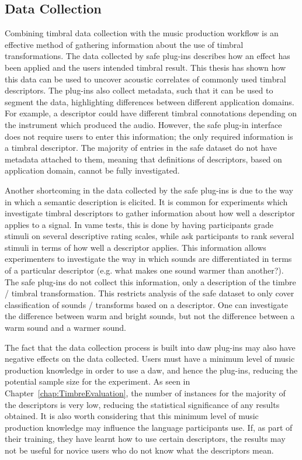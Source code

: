 	\subsection{Data Collection}
	\label{sec:Conclusion-Critique-DataCollection}
		Combining timbral data collection with the music production workflow is an effective method of gathering
		information about the use of timbral transformations. The data collected by \acrshort{safe} plug-ins
		describes how an effect has been applied and the users intended timbral result. This thesis has shown how
		this data can be used to uncover acoustic correlates of commonly used timbral descriptors. The plug-ins also
		collect metadata, such that it can be used to segment the data, highlighting differences between different
		application domains. For example, a descriptor could have different timbral connotations depending on the
		instrument which produced the audio. However, the \acrshort{safe} plug-in interface does not require users
		to enter this information; the only required information is a timbral descriptor. The majority of entries in
		the \acrshort{safe} dataset do not have metadata attached to them, meaning that definitions of descriptors,
		based on application domain, cannot be fully investigated. 

		Another shortcoming in the data collected by the \acrshort{safe} plug-ins is due to the way in which a
		semantic description is elicited. It is common for experiments which investigate timbral descriptors to
		gather information about how well a descriptor applies to a signal. In \acrshort{vame} tests, this is done
		by having participants grade stimuli on several descriptive rating scales, while
		\citet{cartwright2013socialeq} ask participants to rank several stimuli in terms of how well a descriptor
		applies. This information allows experimenters to investigate the way in which sounds are differentiated in
		terms of a particular descriptor (e.g. what makes one sound warmer than another?). The \acrshort{safe}
		plug-ins do not collect this information, only a description of the timbre / timbral transformation. This
		restricts analysis of the \acrshort{safe} dataset to only cover classification of sounds / transforms based
		on a descriptor. One can investigate the difference between warm and bright sounds, but not the difference
		between a warm sound and a warmer sound.

		The fact that the data collection process is built into \acrshort{daw} plug-ins may also have negative
		effects on the data collected. Users must have a minimum level of music production knowledge in order to
		use a \acrshort{daw}, and hence the plug-ins, reducing the potential sample size for the experiment. As seen
		in Chapter~\ref{chap:TimbreEvaluation}, the number of instances for the majority of the descriptors is very
		low, reducing the statistical significance of any results obtained. It is also worth considering that this
		minimum level of music production knowledge may influence the language participants use. If, as part of
		their training, they have learnt how to use certain descriptors, the results may not be useful for novice
		users who do not know what the descriptors mean.

